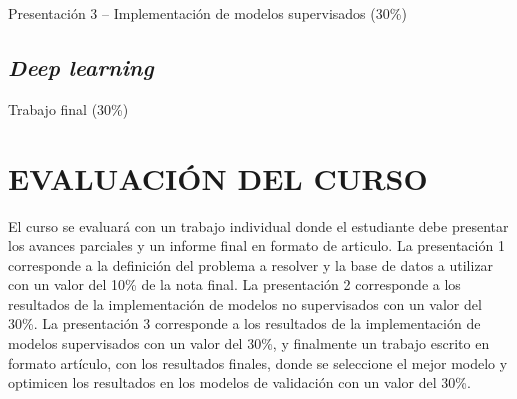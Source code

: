 \documentclass[a4paper,twoside,11pt,]{article}
\begin{document}
\begin{tcolorbox}[enhanced,width=5in,center upper,  fontupper=\large\bfseries,drop shadow southwest,sharp corners]
Presentación 3 -- Implementación de modelos supervisados (30\%)
\end{tcolorbox}

\subsection {\emph{Deep learning}}

\begin{tcolorbox}[enhanced,width=5in,center upper,  fontupper=\large\bfseries,drop shadow southwest,sharp corners]
Trabajo final (30\%)
\end{tcolorbox}

\section{EVALUACIÓN DEL CURSO}
El curso se evaluará con un trabajo individual donde el estudiante debe presentar los avances parciales y un informe final en formato 
de articulo. La presentación 1 corresponde a la definición del problema a resolver y la base de datos a utilizar con un valor 
del 10\% de la nota final. La presentación 2 corresponde a los resultados de la implementación de modelos no supervisados con un 
valor del 30\%. La presentación 3 corresponde a los resultados de la implementación de modelos supervisados con un valor del 30\%, 
y finalmente un trabajo escrito en formato artículo, con los resultados finales, donde se seleccione el mejor modelo y optimicen 
los resultados en los modelos de validación con un valor del 30\%. 
\end{document}
